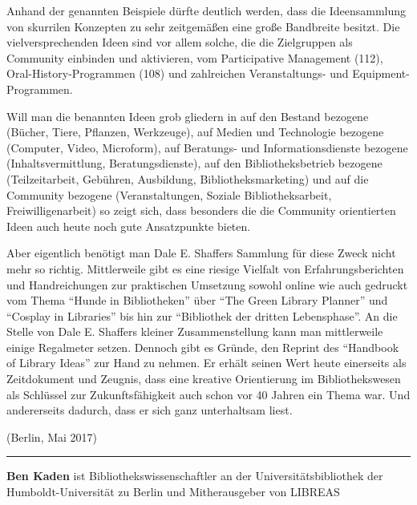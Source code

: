\documentclass[a4paper,
fontsize=11pt,
oneside,
numbers=noperiodatend,
parskip=half-,
bibliography=totoc,
final
]{scrartcl}
\begin{document}
Anhand der genannten Beispiele dürfte deutlich werden, dass die
Ideensammlung von skurrilen Konzepten zu sehr zeitgemäßen eine große
Bandbreite besitzt. Die vielversprechenden Ideen sind vor allem solche,
die die Zielgruppen als Community einbinden und aktivieren, vom
Participative Management (112), Oral-History-Programmen (108) und
zahlreichen Veranstaltungs- und Equipment-Programmen.

Will man die benannten Ideen grob gliedern in auf den Bestand bezogene
(Bücher, Tiere, Pflanzen, Werkzeuge), auf Medien und Technologie
bezogene (Computer, Video, Microform), auf Beratungs- und
Informationsdienste bezogene (Inhaltsvermittlung, Beratungsdienste), auf
den Bibliotheksbetrieb bezogene (Teilzeitarbeit, Gebühren, Ausbildung,
Bibliotheksmarketing) und auf die Community bezogene (Veranstaltungen,
Soziale Bibliotheksarbeit, Freiwilligenarbeit) so zeigt sich, dass
besonders die die Community orientierten Ideen auch heute noch gute
Ansatzpunkte bieten.

Aber eigentlich benötigt man Dale E. Shaffers Sammlung für diese Zweck
nicht mehr so richtig. Mittlerweile gibt es eine riesige Vielfalt von
Erfahrungsberichten und Handreichungen zur praktischen Umsetzung sowohl
online wie auch gedruckt vom Thema \enquote{Hunde in Bibliotheken} über
\enquote{The Green Library Planner} und \enquote{Cosplay in Libraries}
bis hin zur \enquote{Bibliothek der dritten Lebensphase}. An die Stelle
von Dale E. Shaffers kleiner Zusammenstellung kann man mittlerweile
einige Regalmeter setzen. Dennoch gibt es Gründe, den Reprint des
\enquote{Handbook of Library Ideas} zur Hand zu nehmen. Er erhält seinen
Wert heute einerseits als Zeitdokument und Zeugnis, dass eine kreative
Orientierung im Bibliothekswesen als Schlüssel zur Zukunftsfähigkeit
auch schon vor 40 Jahren ein Thema war. Und andererseits dadurch, dass
er sich ganz unterhaltsam liest.

(Berlin, Mai 2017)

\begin{center}\rule{0.5\linewidth}{\linethickness}\end{center}

\textbf{Ben Kaden} ist Bibliothekswissenschaftler an der
Universitätsbibliothek der Humboldt-Universität zu Berlin und
Mitherausgeber von LIBREAS
\end{document}
